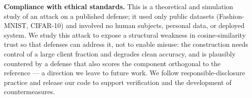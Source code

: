 \documentclass{article}
\begin{document}
\vspace{2pt}\noindent\textbf{Compliance with ethical standards.} This is a
theoretical and simulation study of an attack on a published defense; it used
only public datasets (Fashion-MNIST, CIFAR-10) and involved no human subjects,
personal data, or deployed system. We study this attack to expose a structural
weakness in cosine-similarity trust so that defenses can address it, not to
enable misuse: the construction needs control of a large client fraction and degrades clean accuracy, and is plausibly countered by a defense that also scores the component orthogonal to the reference --- a direction we leave to future work. We follow responsible-disclosure practice and release our code to support verification and the development of countermeasures.

\vfill\pagebreak


\end{document}
